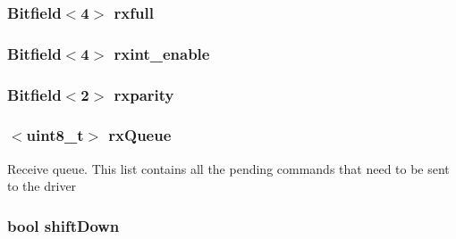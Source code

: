 \label{classPl050_abefe6ab60abda20d7264b5b22bb4048c}
\hypertarget{classPl050_a0ec902d94a3ae210a8266e9ea5e0ff75}{
\subsubsection[{rxfull}]{\setlength{\rightskip}{0pt plus 5cm}Bitfield$<$4$>$ {\bf rxfull}}}
\label{classPl050_a0ec902d94a3ae210a8266e9ea5e0ff75}
\hypertarget{classPl050_ac524c29efd86a04fe395e469bf48963b}{
\subsubsection[{rxint\_\-enable}]{\setlength{\rightskip}{0pt plus 5cm}Bitfield$<$4$>$ {\bf rxint\_\-enable}}}
\label{classPl050_ac524c29efd86a04fe395e469bf48963b}
\hypertarget{classPl050_a1e505c28dece6bcfc640c89e379073d5}{
\subsubsection[{rxparity}]{\setlength{\rightskip}{0pt plus 5cm}Bitfield$<$2$>$ {\bf rxparity}}}
\label{classPl050_a1e505c28dece6bcfc640c89e379073d5}
\hypertarget{classPl050_a8eaa5d81b6a16387d60ab6bcd893700e}{
\subsubsection[{rxQueue}]{$<$uint8\_\-t$>$ {\bf rxQueue}}}
\label{classPl050_a8eaa5d81b6a16387d60ab6bcd893700e}
Receive queue. This list contains all the pending commands that need to be sent to the driver \hypertarget{classPl050_a0a89e7496669527845e89de84902ff53}{
\subsubsection[{shiftDown}]{\setlength{\rightskip}{0pt plus 5cm}bool {\bf shiftDown}}}
